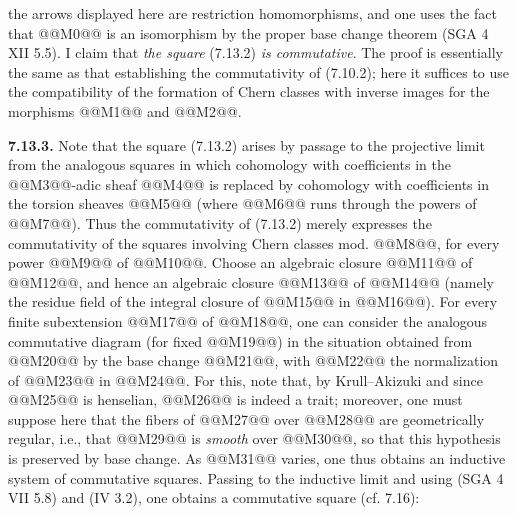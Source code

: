
the arrows displayed here are restriction homomorphisms, and one uses the fact that @@M0@@ is an isomorphism by the proper base change theorem (SGA 4 XII 5.5). I claim that \emph{the square} (7.13.2) \emph{is commutative}. The proof is essentially the same as that establishing the commutativity of (7.10.2); here it suffices to use the compatibility of the formation of Chern classes with inverse images for the morphisms @@M1@@ and @@M2@@.

\textbf{7.13.3.} Note that the square (7.13.2) arises by passage to the projective limit from the analogous squares in which cohomology with coefficients in the @@M3@@-adic sheaf @@M4@@ is replaced by cohomology with coefficients in the torsion sheaves @@M5@@ (where @@M6@@ runs through the powers of @@M7@@). Thus the commutativity of (7.13.2) merely expresses the commutativity of the squares involving Chern classes mod. @@M8@@, for every power @@M9@@ of @@M10@@. Choose an algebraic closure @@M11@@ of @@M12@@, and hence an algebraic closure @@M13@@ of @@M14@@ (namely the residue field of the integral closure of @@M15@@ in @@M16@@). For every finite subextension @@M17@@ of @@M18@@, one can consider the analogous commutative diagram (for fixed @@M19@@) in the situation obtained from @@M20@@ by the base change @@M21@@, with @@M22@@ the normalization of @@M23@@ in @@M24@@. For this, note that, by Krull--Akizuki and since @@M25@@ is henselian, @@M26@@ is indeed a trait; moreover, one must suppose here that the fibers of @@M27@@ over @@M28@@ are geometrically regular, i.e., that @@M29@@ is \emph{smooth} over @@M30@@, so that this hypothesis is preserved by base change. As @@M31@@ varies, one thus obtains an inductive system of commutative squares. Passing to the inductive limit and using (SGA 4 VII 5.8) and (IV 3.2), one obtains a commutative square (cf. 7.16):
